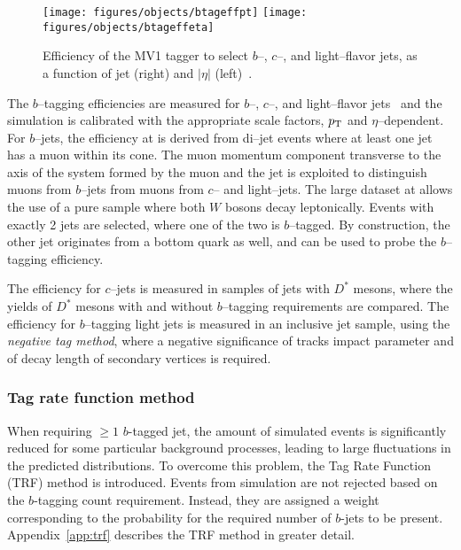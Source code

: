 \begin{figure}[htb!]\centering
  \texttt{[image: figures/objects/btageffpt]}
  \texttt{[image: figures/objects/btageffeta]}
  \caption{Efficiency of the MV1 tagger to select $b$--, $c$--, and
    light--flavor jets, as a function of jet \pt{} (right) and
    $|\eta|$ (left)~\cite{ATLAS-CONF-2014-046}.} 
  \label{fig:btag}
\end{figure}

The $b$--tagging efficiencies are measured for 
$b$--, $c$--, and light--flavor jets~\cite{btagging,ctagging,ltagging}
and the simulation is calibrated with the appropriate scale factors,
$p_{\mathrm{T}}$ and $\eta$--dependent.
For $b$--jets, the efficiency at \seventev{} is
derived from di--jet events where at least one jet has a muon within
its cone. 
The muon momentum component transverse to
the axis of the system formed by the muon and the jet is exploited
to distinguish muons from $b$--jets from muons from $c$-- and
light--jets. 
The large dataset at \eighttev{} allows the use of a pure
\ttbar{} sample where both $W$ bosons decay leptonically. Events with exactly
2 jets are selected, where one of the two is $b$--tagged. By
construction, the other jet originates from a bottom quark as well, and
can be used to probe the $b$--tagging efficiency.

The efficiency for $c$--jets is measured in samples of jets with
$D^*$ mesons, where the yields of $D^*$ mesons with and without
$b$--tagging requirements are compared.
The efficiency for $b$--tagging light jets is measured in an inclusive
jet sample, using the {\it negative tag method}, where a negative
significance of tracks impact parameter and of decay 
length of secondary vertices is required.

\subsubsection{Tag rate function method}
\label{sec:trf}

When requiring $\geq 1$ $b$-tagged jet, the amount of simulated events
is significantly reduced for some particular background
processes, leading to large fluctuations in the predicted distributions.
To overcome this problem, the Tag Rate Function (TRF) method is introduced.
Events from simulation are not rejected based on the $b$-tagging count
requirement. Instead, they are assigned a weight corresponding to the
probability for the required number of $b$-jets to be present.
Appendix~\ref{app:trf} describes the TRF method in greater detail.

